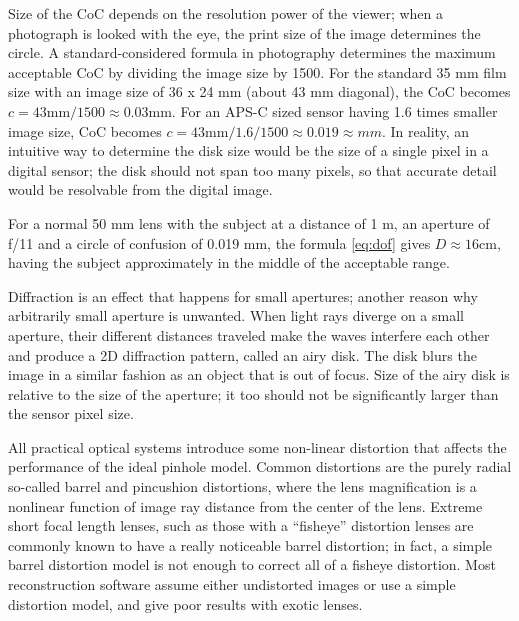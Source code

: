 Size of the CoC depends on the resolution power of the viewer; when a photograph is looked with the eye, the print size of the image determines the circle.
A standard-considered formula in photography determines the maximum acceptable CoC by dividing the image size by 1500.
For the standard 35 mm film size with an image size of 36 x 24 mm (about 43 mm diagonal), the CoC becomes $c = 43 \text{mm} / 1500 \approx 0.03 \text{mm}$.
For an APS-C sized sensor having 1.6 times smaller image size, CoC becomes $c = 43 \text{mm} / 1.6 / 1500 \approx 0.019 \approx{mm}$.
In reality, an intuitive way to determine the disk size would be the size of a single pixel in a digital sensor;
the disk should not span too many pixels, so that accurate detail would be resolvable from the digital image.

For a normal 50 mm lens with the subject at a distance of 1 m, an aperture of f/11 and a circle of confusion of 0.019 mm, the formula \ref{eq:dof} gives $D \approx 16 \text{cm}$, having the subject approximately in the middle of the acceptable range.




Diffraction is an effect that happens for small apertures; another reason why arbitrarily small aperture is unwanted.
When light rays diverge on a small aperture, their different distances traveled make the waves interfere each other and produce a 2D diffraction pattern, called an airy disk.
The disk blurs the image in a similar fashion as an object that is out of focus.
Size of the airy disk is relative to the size of the aperture; it too should not be significantly larger than the sensor pixel size.



All practical optical systems introduce some non-linear distortion that affects the performance of the ideal pinhole model.
Common distortions are the purely radial so-called barrel and pincushion distortions, where the lens magnification is a nonlinear function of image ray distance from the center of the lens.
\cite{brown1966decentering}
Extreme short focal length lenses, such as those with a ``fisheye'' distortion lenses are commonly known to have a really noticeable barrel distortion; in fact, a simple barrel distortion model is not enough to correct all of a fisheye distortion.
Most reconstruction software assume either undistorted images or use a simple distortion model, and give poor results with exotic lenses.


